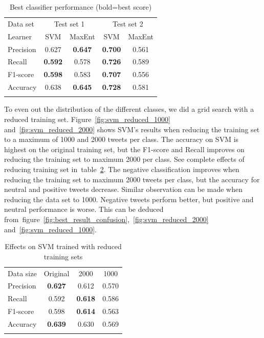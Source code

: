 \begin{table}[!htb]
	\centering
	\begin{tabular}{l|cc|cc} 
	\noalign{\smallskip}\hline\noalign{\smallskip}
	Data set & \multicolumn{2}{c|}{Test set 1} & \multicolumn{2}{c}{Test set 2} \\
	Learner  & SVM    & MaxEnt & SVM    & MaxEnt \\
	\noalign{\smallskip}\hline\noalign{\smallskip}
	Precision  & 0.627  & {\bf 0.647}   & {\bf 0.700}  & 0.561 \\
	Recall       & {\bf 0.592}  & 0.578  & {\bf 0.726}  & 0.589 \\
	F1-score  & {\bf 0.598}  & 0.583  & {\bf 0.707}  & 0.556 \\
	Accuracy & 0.638  & {\bf 0.645}  & {\bf 0.728}  & 0.581 \\
	\noalign{\smallskip}\hline\noalign{\smallskip}
	\end{tabular}
	\caption{Best classifier performance {\small (bold=best score)}}
	\label{tab:performance}
\end{table}


To even out the distribution of the different classes, we did a grid search with a reduced training set. Figure~\ref{fig:svm_reduced_1000} and~\ref{fig:svm_reduced_2000} shows SVM's results when reducing the training set to a maximum of 1000 and 2000 tweets per class. The accuracy on SVM is highest on the original training set, but the F1-score and Recall improves on reducing the training set to maximum 2000 per class. See complete effects of reducing training set in~table~\ref{tab:svm_reduced}. The negative classification improves when reducing the training set to maximum 2000 tweets per class, but the accuracy for neutral and positive tweets decrease. Similar observation can be made when reducing the data set to 1000. Negative tweets perform better, but positive and neutral performance is worse. This can be deduced from~figure~\ref{fig:best_result_confusion},~\ref{fig:svm_reduced_2000} and~\ref{fig:svm_reduced_1000}.


\begin{table}[!htb]
	\centering
	\begin{tabular}{l|ccc} 
	\noalign{\smallskip}\hline\noalign{\smallskip}
	Data size  & Original       & 2000   & 1000 \\
	\noalign{\smallskip}\hline\noalign{\smallskip}
	Precision  & {\bf 0.627}  & 0.612 & 0.570 \\
	Recall       & 0.592  & \textbf{0.618} & 0.586 \\
	F1-score  & 0.598  & \textbf{0.614} & 0.563 \\
	Accuracy & {\bf 0.639}  & 0.630 & 0.569 \\
	\noalign{\smallskip}\hline\noalign{\smallskip}
	\end{tabular}
	\caption{Effects on SVM trained with reduced training sets}
	\label{tab:svm_reduced}
\end{table}


